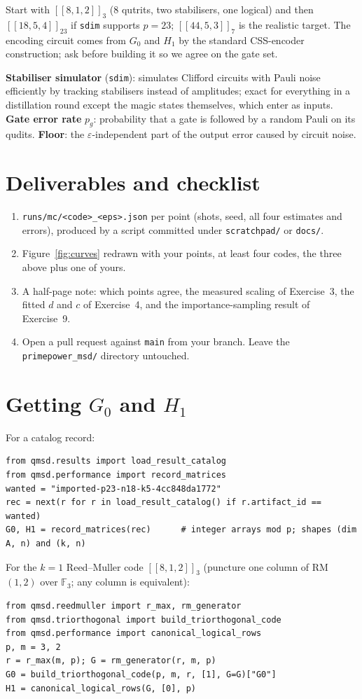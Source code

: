 \documentclass[11pt]{article}
\newcommand{\eps}{\varepsilon}
\newcommand{\code}[1]{\texttt{#1}}
\newcommand{\F}{\mathbb{F}}
\begin{document}
Start with $[[8,1,2]]_3$ (8 qutrits, two stabilisers, one logical) and then
$[[18,5,4]]_{23}$ if \code{sdim} supports $p=23$; $[[44,5,3]]_7$ is the realistic
target. The encoding circuit comes from $G_0$ and $H_1$ by the standard
CSS-encoder construction; ask before building it so we agree on the gate set.

\begin{vocab}
\textbf{Stabiliser simulator} (\code{sdim}): simulates Clifford circuits with Pauli
noise efficiently by tracking stabilisers instead of amplitudes; exact for
everything in a distillation round except the magic states themselves, which enter
as inputs.
\textbf{Gate error rate} $p_g$: probability that a gate is followed by a random
Pauli on its qudits.
\textbf{Floor}: the $\eps$-independent part of the output error caused by circuit
noise.
\end{vocab}

\section{Deliverables and checklist}

\begin{enumerate}[nosep]
\item \code{runs/mc/<code>\_<eps>.json} per point (shots, seed, all four estimates and
  errors), produced by a script committed under \code{scratchpad/} or \code{docs/}.
\item Figure~\ref{fig:curves} redrawn with your points, at least four codes, the
  three above plus one of yours.
\item A half-page note: which points agree, the measured scaling of
  Exercise~3, the fitted $d$ and $c$ of Exercise~4, and the importance-sampling
  result of Exercise~9.
\item Open a pull request against \code{main} from your branch. Leave the
  \code{primepower\_msd/} directory untouched.
\end{enumerate}

\appendix

\section{Getting $G_0$ and $H_1$}\label{app:matrices}

For a catalog record:
\begin{lstlisting}
from qmsd.results import load_result_catalog
from qmsd.performance import record_matrices
wanted = "imported-p23-n18-k5-4cc848da1772"
rec = next(r for r in load_result_catalog() if r.artifact_id == wanted)
G0, H1 = record_matrices(rec)      # integer arrays mod p; shapes (dim A, n) and (k, n)
\end{lstlisting}
For the $k=1$ Reed--Muller code $[[8,1,2]]_3$ (puncture one column of RM$(1,2)$ over
$\F_3$; any column is equivalent):
\begin{lstlisting}
from qmsd.reedmuller import r_max, rm_generator
from qmsd.triorthogonal import build_triorthogonal_code
from qmsd.performance import canonical_logical_rows
p, m = 3, 2
r = r_max(m, p); G = rm_generator(r, m, p)
G0 = build_triorthogonal_code(p, m, r, [1], G=G)["G0"]
H1 = canonical_logical_rows(G, [0], p)
\end{lstlisting}
\end{document}
